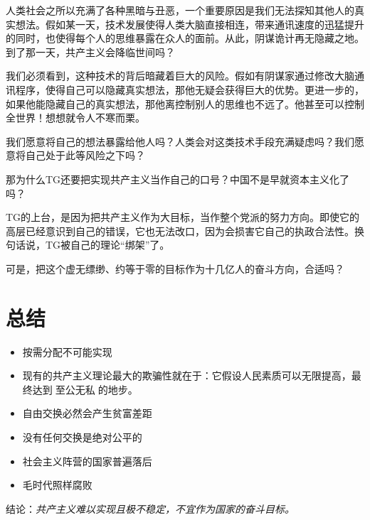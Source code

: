 人类社会之所以充满了各种黑暗与丑恶，一个重要原因是我们无法探知其他人的真实想法。假如某一天，技术发展使得人类大脑直接相连，带来通讯速度的迅猛提升的同时，也使得每个人的思维暴露在众人的面前。从此，阴谋诡计再无隐藏之地。到了那一天，共产主义会降临世间吗？

我们必须看到，这种技术的背后暗藏着巨大的风险。假如有阴谋家通过修改大脑通讯程序，使得自己可以隐藏真实想法，那他无疑会获得巨大的优势。更进一步的，如果他能隐藏自己的真实想法，那他离控制别人的思维也不远了。他甚至可以控制全世界！想想就令人不寒而栗。

我们愿意将自己的想法暴露给他人吗？人类会对这类技术手段充满疑虑吗？我们愿意将自己处于此等风险之下吗？

\zPar

那为什么TG还要把实现共产主义当作自己的口号？中国不是早就资本主义化了吗？

TG的上台，是因为把共产主义作为大目标，当作整个党派的努力方向。即使它的高层已经意识到自己的错误，它也无法改口，因为会损害它自己的执政合法性。换句话说，TG被自己的理论“绑架”了。

可是，把这个虚无缥缈、约等于零的目标作为十几亿人的奋斗方向，合适吗？

\section{总结}

\begin{itemize}
	\item 按需分配不可能实现
	\item 现有的共产主义理论最大的欺骗性就在于：它假设人民素质可以无限提高，最终达到至公无私的地步。
	\item 自由交换必然会产生贫富差距
	\item 没有任何交换是绝对公平的
	\item 社会主义阵营的国家普遍落后
	\item 毛时代照样腐败
\end{itemize}

结论：\emph{共产主义难以实现且极不稳定，不宜作为国家的奋斗目标。}


